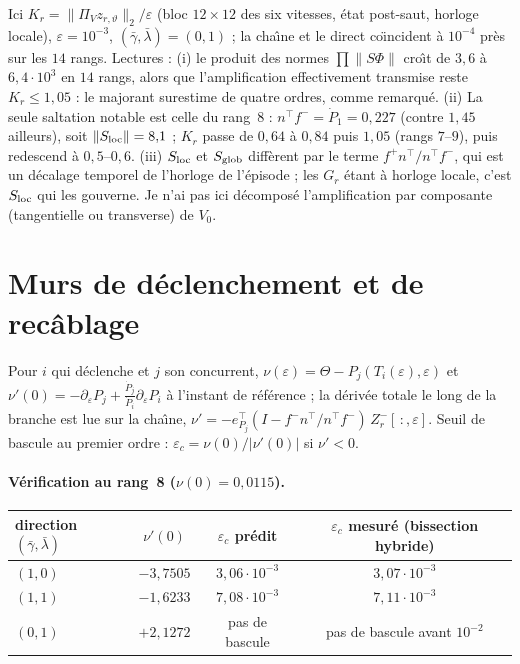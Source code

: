 \documentclass[11pt,a4paper]{article}
\theoremstyle{remark}
\newcommand{\norm}[1]{\lVert #1\rVert}
\newcommand{\vth}{\vartheta}
\begin{document}
Ici $K_r=\norm{\Pi_V z_{r,\vth}}_2/\varepsilon$ (bloc $12\times12$ des six vitesses, \'etat post-saut, horloge locale), $\varepsilon=10^{-3}$, $(\bar\gamma,\bar\lambda)=(0,1)$ ; la cha\^{\i}ne et le direct co\"{\i}ncident \`a $10^{-4}$ pr\`es sur les $14$ rangs. Lectures : (i) le produit des normes $\prod\lVert S\Phi\rVert$ cro\^{\i}t de $3{,}6$ \`a $6{,}4\cdot10^3$ en $14$ rangs, alors que l'amplification effectivement transmise reste $K_r\le1{,}05$ : le majorant surestime de quatre ordres, comme remarqu\'e. (ii) La seule saltation notable est celle du rang~8 : $n^\top f^-=\dot P_1=0{,}227$ (contre $1{,}45$ ailleurs), soit $\lVert S_{\rm loc}\rVert=8{,}1$ ; $K_r$ passe de $0{,}64$ \`a $0{,}84$ puis $1{,}05$ (rangs $7$--$9$), puis redescend \`a $0{,}5$--$0{,}6$. (iii) $S_{\rm loc}$ et $S_{\rm glob}$ diff\`erent par le terme $f^+n^\top/n^\top f^-$, qui est un d\'ecalage temporel de l'horloge de l'\'episode ; les $G_r$ \'etant \`a horloge locale, c'est $S_{\rm loc}$ qui les gouverne. Je n'ai pas ici d\'ecompos\'e l'amplification par composante (tangentielle ou transverse) de $V_0$.

\section{Murs de d\'eclenchement et de recâblage}\label{sec:murs}
Pour $i$ qui d\'eclenche et $j$ son concurrent, $\nu(\varepsilon)=\Theta-P_j(T_i(\varepsilon),\varepsilon)$ et $\nu'(0)=-\partial_\varepsilon P_j+\frac{\dot P_j}{\dot P_i}\partial_\varepsilon P_i$ \`a l'instant de r\'ef\'erence ; la d\'eriv\'ee totale le long de la branche est lue sur la cha\^{\i}ne, $\nu'=-e_{P_j}^\top(I-f^-n^\top/n^\top f^-)\,Z_r^-[\,:,\varepsilon]$. Seuil de bascule au premier ordre : $\varepsilon_c=\nu(0)/\lvert\nu'(0)\rvert$ si $\nu'<0$.

\paragraph{V\'erification au rang~8 ($\nu(0)=0{,}0115$).}
\begin{center}\small
\begin{tabular}{lccc}
\toprule
direction $(\bar\gamma,\bar\lambda)$ & $\nu'(0)$ & $\varepsilon_c$ pr\'edit & $\varepsilon_c$ mesur\'e (bissection hybride)\\
\midrule
$(1,0)$ & $-3{,}7505$ & $3{,}06\cdot10^{-3}$ & $3{,}07\cdot10^{-3}$\\
$(1,1)$ & $-1{,}6233$ & $7{,}08\cdot10^{-3}$ & $7{,}11\cdot10^{-3}$\\
$(0,1)$ & $+2{,}1272$ & pas de bascule & pas de bascule avant $10^{-2}$\\
\bottomrule
\end{tabular}
\end{center}
\end{document}
